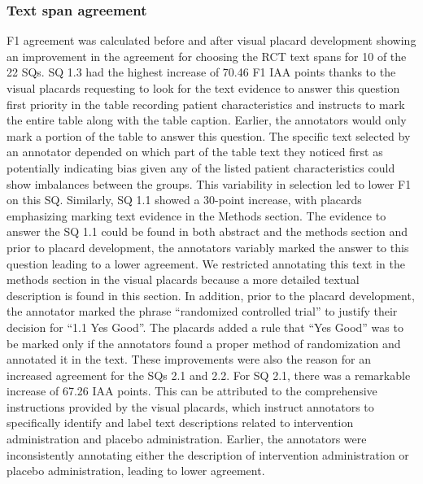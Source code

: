 \documentclass[sn-mathphys,Numbered]{sn-jnl}%
\theoremstyle{thmstyleone}%
\theoremstyle{thmstyletwo}%
\theoremstyle{thmstylethree}%
\begin{document}
\subsubsection{Text span agreement}
\label{disc:f1}
%
F1 agreement was calculated before and after visual placard development showing an improvement in the agreement for choosing the RCT text spans for 10 of the 22 SQs.
SQ 1.3 had the highest increase of 70.46 F1 IAA points thanks to the visual placards requesting to look for the text evidence to answer this question first priority in the table recording patient characteristics and instructs to mark the entire table along with the table caption.
Earlier, the annotators would only mark a portion of the table to answer this question. 
The specific text selected by an annotator depended on which part of the table text they noticed first as potentially indicating bias given any of the listed patient characteristics could show imbalances between the groups.
This variability in selection led to lower F1 on this SQ.
Similarly, SQ 1.1 showed a 30-point increase, with placards emphasizing marking text evidence in the Methods section.
The evidence to answer the SQ 1.1 could be found in both abstract and the methods section and prior to placard development, the annotators variably marked the answer to this question leading to a lower agreement.
We restricted annotating this text in the methods section in the visual placards because a more detailed textual description is found in this section.
In addition, prior to the placard development, the annotator marked the phrase ``randomized controlled trial'' to justify their decision for ``1.1 Yes Good''.
The placards added a rule that ``Yes Good'' was to be marked only if the annotators found a proper method of randomization and annotated it in the text.
These improvements were also the reason for an increased agreement for the SQs 2.1 and 2.2.
For SQ 2.1, there was a remarkable increase of 67.26 IAA points.
This can be attributed to the comprehensive instructions provided by the visual placards, which instruct annotators to specifically identify and label text descriptions related to intervention administration and placebo administration.
Earlier, the annotators were inconsistently annotating either the description of intervention administration or placebo administration, leading to lower agreement.
\end{document}
